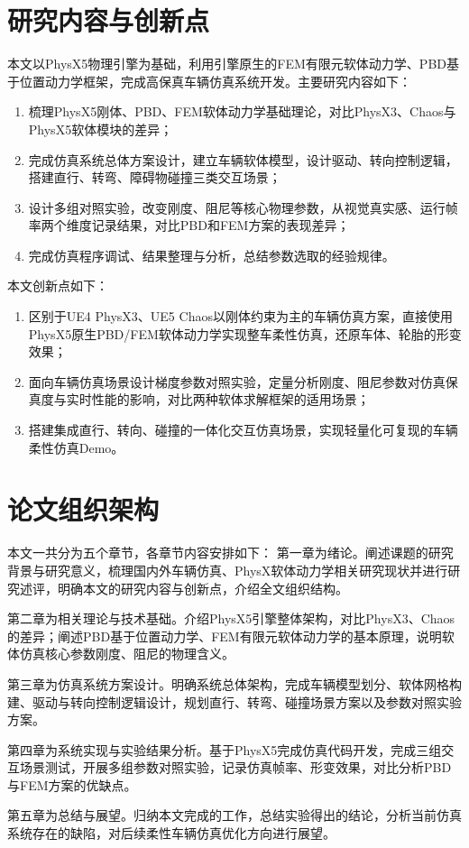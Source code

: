 \section{研究内容与创新点}
本文以PhysX5物理引擎为基础，利用引擎原生的FEM有限元软体动力学、PBD基于位置动力学框架，完成高保真车辆仿真系统开发。主要研究内容如下：
\begin{enumerate}
    \item 梳理PhysX5刚体、PBD、FEM软体动力学基础理论，对比PhysX3、Chaos与PhysX5软体模块的差异；
    \item 完成仿真系统总体方案设计，建立车辆软体模型，设计驱动、转向控制逻辑，搭建直行、转弯、障碍物碰撞三类交互场景；
    \item 设计多组对照实验，改变刚度、阻尼等核心物理参数，从视觉真实感、运行帧率两个维度记录结果，对比PBD和FEM方案的表现差异；
    \item 完成仿真程序调试、结果整理与分析，总结参数选取的经验规律。
\end{enumerate}

本文创新点如下：
\begin{enumerate}
    \item 区别于UE4 PhysX3、UE5 Chaos以刚体约束为主的车辆仿真方案，直接使用PhysX5原生PBD/FEM软体动力学实现整车柔性仿真，还原车体、轮胎的形变效果；
    \item 面向车辆仿真场景设计梯度参数对照实验，定量分析刚度、阻尼参数对仿真保真度与实时性能的影响，对比两种软体求解框架的适用场景；
    \item 搭建集成直行、转向、碰撞的一体化交互仿真场景，实现轻量化可复现的车辆柔性仿真Demo。
\end{enumerate}

\section{论文组织架构}
本文一共分为五个章节，各章节内容安排如下：
第一章为绪论。阐述课题的研究背景与研究意义，梳理国内外车辆仿真、PhysX软体动力学相关研究现状并进行研究述评，明确本文的研究内容与创新点，介绍全文组织结构。

第二章为相关理论与技术基础。介绍PhysX5引擎整体架构，对比PhysX3、Chaos的差异；阐述PBD基于位置动力学、FEM有限元软体动力学的基本原理，说明软体仿真核心参数刚度、阻尼的物理含义。

第三章为仿真系统方案设计。明确系统总体架构，完成车辆模型划分、软体网格构建、驱动与转向控制逻辑设计，规划直行、转弯、碰撞场景方案以及参数对照实验方案。

第四章为系统实现与实验结果分析。基于PhysX5完成仿真代码开发，完成三组交互场景测试，开展多组参数对照实验，记录仿真帧率、形变效果，对比分析PBD与FEM方案的优缺点。

第五章为总结与展望。归纳本文完成的工作，总结实验得出的结论，分析当前仿真系统存在的缺陷，对后续柔性车辆仿真优化方向进行展望。
